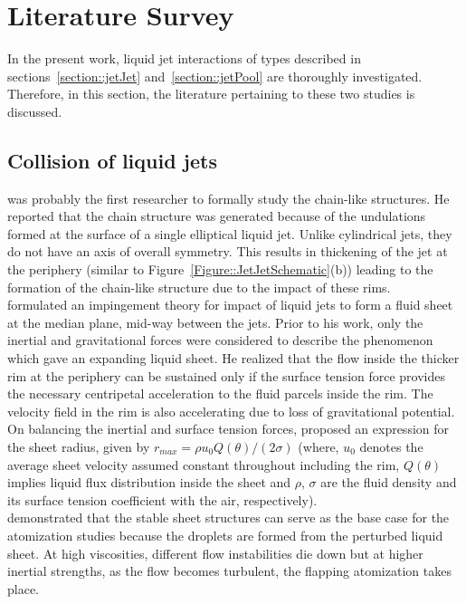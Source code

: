 \section{Literature Survey}
In the present work, liquid jet interactions of types described in sections~\ref{section::jetJet} and~\ref{section::jetPool} are thoroughly investigated. Therefore, in this section, the literature pertaining to these two studies is discussed.
\subsection{Collision of liquid jets}
\citet{rayleigh1879capillary,rayleigh1889tension} was probably the first researcher to formally study the chain-like structures. He reported that the chain structure was generated because of the undulations formed at the surface of a single elliptical liquid jet. Unlike cylindrical jets, they do not have an axis of overall symmetry. This results in thickening of the jet at the periphery (similar to Figure~\ref{Figure::JetJetSchematic}(b)) leading to the formation of the chain-like structure due to the impact of these rims.\\
\citet{taylor1960formation} formulated an impingement theory for impact of liquid jets to form a fluid sheet at the median plane, mid-way between the jets. Prior to his work, only the inertial and gravitational forces were considered to describe the phenomenon which gave an expanding liquid sheet. He realized that the flow inside the thicker rim at the periphery can be sustained only if the  surface tension force provides the necessary centripetal acceleration to the fluid parcels inside the rim. The velocity field in the rim is also accelerating due to loss of gravitational potential. On balancing the inertial and surface tension forces, \citet{taylor1960formation} proposed an expression for the sheet radius, given by $r_{max} = \rho u_0Q(\theta)/(2\sigma)$ (where, $u_0$ denotes the average sheet velocity assumed constant throughout including the rim, $Q(\theta)$ implies liquid flux distribution inside the sheet and $\rho$, $\sigma$ are the fluid density and its surface tension coefficient with the air, respectively).\\
\citet{ibrahim1991impinging} demonstrated that the stable sheet structures can serve as the base case for the atomization studies because the droplets are formed from the perturbed liquid sheet. At high viscosities, different flow instabilities die down but at higher inertial strengths, as the flow becomes turbulent, the flapping atomization takes place.\\
